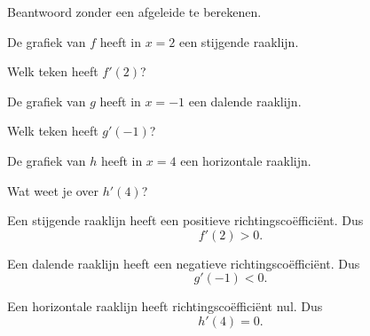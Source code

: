 \documentclass{ximera}
\begin{document}
\begin{oefening}{\oefB\ESS}

Beantwoord zonder een afgeleide te berekenen.

\begin{question}
De grafiek van $f$ heeft in $x=2$ een stijgende raaklijn.

Welk teken heeft $f'(2)$?
\end{question}

\begin{question}
De grafiek van $g$ heeft in $x=-1$ een dalende raaklijn.

Welk teken heeft $g'(-1)$?
\end{question}

\begin{question}
De grafiek van $h$ heeft in $x=4$ een horizontale raaklijn.

Wat weet je over $h'(4)$?
\end{question}

\begin{oplossing}

Een stijgende raaklijn heeft een positieve richtingscoëfficiënt. Dus
\[
f'(2)>0.
\]

Een dalende raaklijn heeft een negatieve richtingscoëfficiënt. Dus
\[
g'(-1)<0.
\]

Een horizontale raaklijn heeft richtingscoëfficiënt nul. Dus
\[
h'(4)=0.
\]

\end{oplossing}

\end{oefening}


\end{document}
